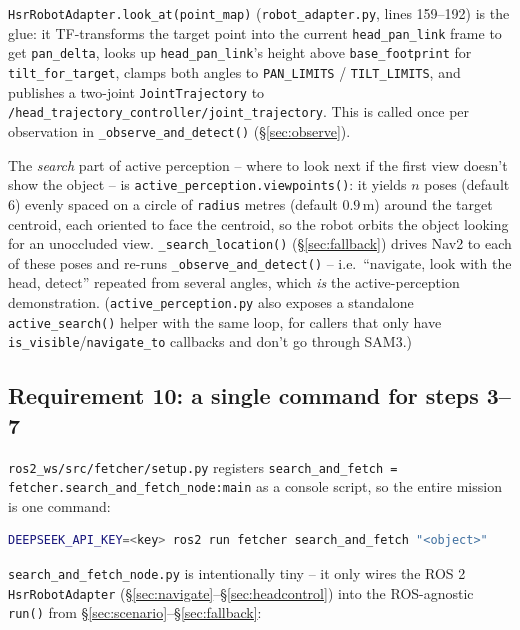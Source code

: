 \documentclass[11pt]{article}
\begin{document}
\texttt{HsrRobotAdapter.look\_at(point\_map)} (\texttt{robot\_adapter.py},
lines 159--192) is the glue: it TF-transforms the target point into the
current \texttt{head\_pan\_link} frame to get \texttt{pan\_delta}, looks up
\texttt{head\_pan\_link}'s height above \texttt{base\_footprint} for
\texttt{tilt\_for\_target}, clamps both angles to \texttt{PAN\_LIMITS} /
\texttt{TILT\_LIMITS}, and publishes a two-joint
\texttt{JointTrajectory} to \texttt{/head\_trajectory\_controller/joint\_trajectory}.
This is called once per observation in \texttt{\_observe\_and\_detect()}
(\S\ref{sec:observe}).

The \emph{search} part of active perception -- where to look next if the
first view doesn't show the object -- is \texttt{active\_perception.viewpoints()}:
it yields $n$ poses (default 6) evenly spaced on a circle of \texttt{radius}
metres (default $0.9\,$m) around the target centroid, each oriented to face
the centroid, so the robot orbits the object looking for an unoccluded view.
\texttt{\_search\_location()} (\S\ref{sec:fallback}) drives Nav2 to each of
these poses and re-runs \texttt{\_observe\_and\_detect()} -- i.e.\ ``navigate,
look with the head, detect'' repeated from several angles, which \emph{is}
the active-perception demonstration. (\texttt{active\_perception.py} also
exposes a standalone \texttt{active\_search()} helper with the same loop, for
callers that only have \texttt{is\_visible}/\texttt{navigate\_to} callbacks
and don't go through SAM3.)

\subsection{Requirement 10: a single command for steps 3--7}
\label{sec:singlecmd}

\texttt{ros2\_ws/src/fetcher/setup.py} registers
\texttt{search\_and\_fetch = fetcher.search\_and\_fetch\_node:main} as a
console script, so the entire mission is one command:

\begin{lstlisting}[language=bash,style=sh,caption={Running the mission}]
DEEPSEEK_API_KEY=<key> ros2 run fetcher search_and_fetch "<object>"
\end{lstlisting}

\texttt{search\_and\_fetch\_node.py} is intentionally tiny -- it only wires
the ROS 2 \texttt{HsrRobotAdapter} (\S\ref{sec:navigate}--\S\ref{sec:headcontrol})
into the ROS-agnostic \texttt{run()} from \S\ref{sec:scenario}--\S\ref{sec:fallback}:
\end{document}
